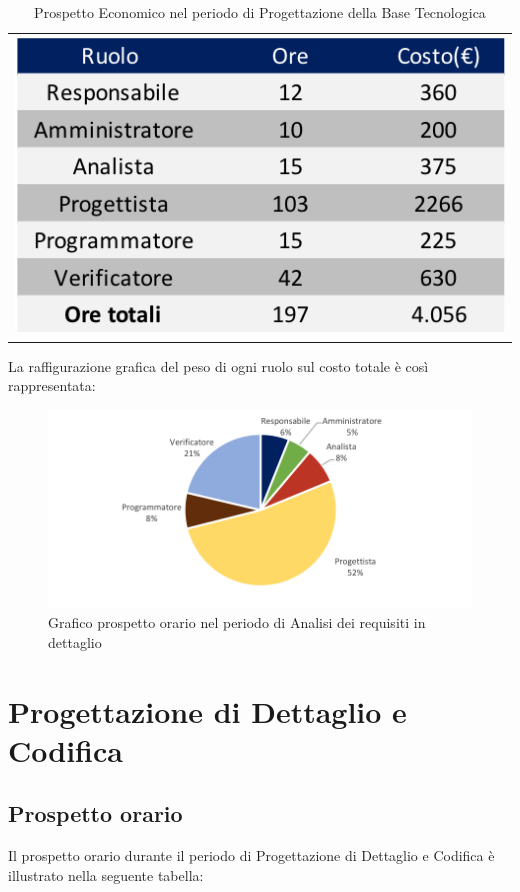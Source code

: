 \begin{table}[!ht]
	\begin{center}
		\begin{tabular}{c}
			\includegraphics{images/tabellaProgettazioneTecnologicaEuro.png}
		\end{tabular}
		\caption{Prospetto Economico nel periodo di Progettazione della Base Tecnologica}
	\end{center}
\end{table}

La raffigurazione grafica del peso di ogni ruolo sul costo totale è così rappresentata:
\begin{figure}[!ht]
	\begin{center}
		\includegraphics{images/grafoProgettazioneTecnologicaEuro.png}
		\caption{Grafico prospetto orario nel periodo di Analisi dei requisiti in dettaglio}
	\end{center}
\end{figure}
\newpage
\section{Progettazione di Dettaglio e Codifica}
\subsection{Prospetto orario}
Il prospetto orario durante il periodo di Progettazione di Dettaglio e Codifica è illustrato nella seguente tabella:


